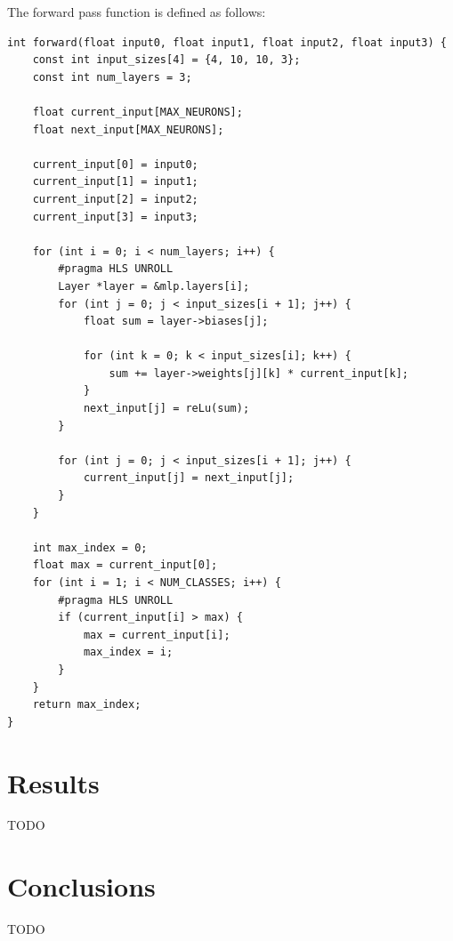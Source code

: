 \documentclass{article}
\begin{document}
The forward pass function is defined as follows:
\begin{lstlisting}
int forward(float input0, float input1, float input2, float input3) {
    const int input_sizes[4] = {4, 10, 10, 3};
    const int num_layers = 3;

    float current_input[MAX_NEURONS];
    float next_input[MAX_NEURONS];

    current_input[0] = input0;
    current_input[1] = input1;
    current_input[2] = input2;
    current_input[3] = input3;

    for (int i = 0; i < num_layers; i++) {
        #pragma HLS UNROLL
        Layer *layer = &mlp.layers[i];
        for (int j = 0; j < input_sizes[i + 1]; j++) {
            float sum = layer->biases[j];
            
            for (int k = 0; k < input_sizes[i]; k++) {
                sum += layer->weights[j][k] * current_input[k];
            }
            next_input[j] = reLu(sum);
        }

        for (int j = 0; j < input_sizes[i + 1]; j++) {
            current_input[j] = next_input[j];
        }
    }

    int max_index = 0;
    float max = current_input[0];
    for (int i = 1; i < NUM_CLASSES; i++) {
        #pragma HLS UNROLL
        if (current_input[i] > max) {
            max = current_input[i];
            max_index = i;
        }
    }
    return max_index;
}
\end{lstlisting}


\section{Results}
TODO

\section{Conclusions}
TODO
\end{document}

